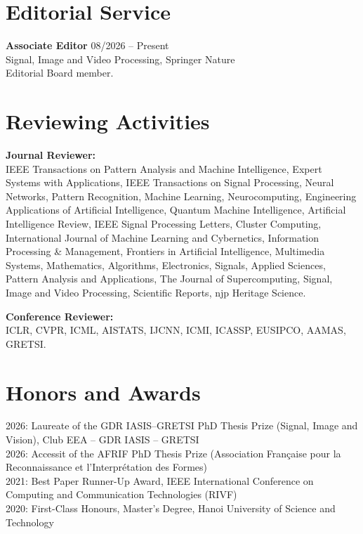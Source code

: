 \documentclass[11pt,a4paper]{article}
\newcommand{\entry}[4]{%
  \textbf{#1} \hfill #2\\
  #3\\
  #4
}
\begin{document}
\section{Editorial Service}

\entry
{Associate Editor}
{08/2026 -- Present}
{Signal, Image and Video Processing, Springer Nature}
{Editorial Board member.}
\section{Reviewing Activities}
\textbf{Journal Reviewer:}
\\
IEEE Transactions on Pattern Analysis and Machine Intelligence, Expert Systems with Applications, IEEE Transactions on Signal Processing, Neural Networks, Pattern Recognition, Machine Learning, Neurocomputing, Engineering Applications of Artificial Intelligence, Quantum Machine Intelligence, Artificial Intelligence Review, IEEE Signal Processing Letters, Cluster Computing, International Journal of Machine Learning and Cybernetics, Information Processing \& Management, Frontiers in Artificial Intelligence, Multimedia Systems, Mathematics, Algorithms, Electronics, Signals, Applied Sciences, Pattern Analysis and Applications, The Journal of Supercomputing, Signal, Image and Video Processing, Scientific Reports, njp Heritage Science.

\textbf{Conference Reviewer:}
\\
ICLR, CVPR, ICML, AISTATS, IJCNN, ICMI, ICASSP, EUSIPCO, AAMAS, GRETSI.
\section{Honors and Awards}
2026: Laureate of the GDR IASIS–GRETSI PhD Thesis Prize (Signal, Image and Vision), Club EEA – GDR IASIS – GRETSI \\
2026: Accessit of the AFRIF PhD Thesis Prize (Association Française pour la Reconnaissance et l’Interprétation des Formes) \\
2021: Best Paper Runner-Up Award, IEEE International Conference on Computing and Communication Technologies (RIVF) \\
2020: First-Class Honours, Master's Degree, Hanoi University of Science and Technology \\
\end{document}
